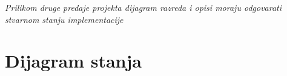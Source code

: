 			\textit{Prilikom druge predaje projekta dijagram razreda i opisi moraju odgovarati stvarnom stanju implementacije}
			
			
			
			\eject
		
		\section{Dijagram stanja}
			
			
			
			
